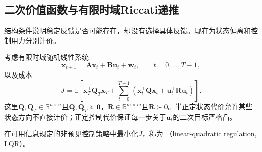 \subsection{二次价值函数与有限时域Riccati递推}
结构条件说明稳定反馈是否可能存在，却没有选择具体反馈。现在为状态偏离和控制用力分别计价。
\begin{definition}[有限时域线性二次调节]
\label{def:control-finite-horizon-lqr}
考虑有限时域随机线性系统
\begin{equation}
  \bm{x}_{t+1}
  =
  \bm{A}\bm{x}_t+\bm{B}\bm{u}_t+\bm{w}_t,
  \qquad t=0,\ldots,T-1,
  \label{eq:control-lqr-dynamics}
\end{equation}
以及成本
\begin{equation}
  J
  =
  \mathbb{E}\left[
    \bm{x}_T^{\top}\bm{Q}_T\bm{x}_T
    +
    \sum_{t=0}^{T-1}
    \left(
      \bm{x}_t^{\top}\bm{Q}\bm{x}_t
      +
      \bm{u}_t^{\top}\bm{R}\bm{u}_t
    \right)
  \right].
  \label{eq:control-lqr-cost}
\end{equation}
这里$\bm{Q},\bm{Q}_T\in\mathbb{R}^{n\times n}$且$\bm{Q},\bm{Q}_T\succeq\bm{0}$，$\bm{R}\in\mathbb{R}^{m\times m}$且$\bm{R}\succ\bm{0}$。半正定状态代价允许某些状态方向不直接计价；正定控制代价保证每一步关于$\bm{u}_t$的二次目标严格凸。

在可用信息规定的非预见控制策略中最小化$J$，称为
（linear-quadratic regulation, LQR）。
\end{definition}

